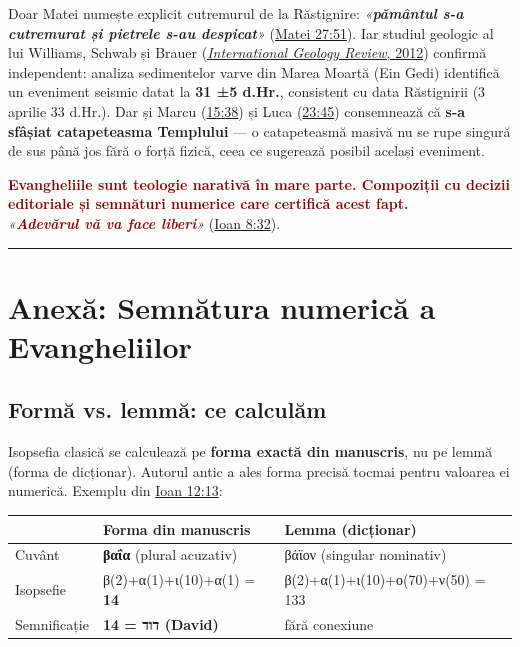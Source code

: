 \documentclass[12pt,a4paper,twoside,openany]{book}
\begin{document}
Doar Matei numește explicit cutremurul de la Răstignire: \textit{«\textbf{pământul s-a cutremurat și pietrele s-au despicat}»} (\href{https://bibliaortodoxa.ro/carte.php?id=55\&cap=27\#51}{Matei 27:51}). Iar studiul geologic al lui Williams, Schwab și Brauer (\href{https://doi.org/10.1080/00206814.2011.639996}{\textit{International Geology Review}, 2012}) confirmă independent: analiza sedimentelor varve din Marea Moartă (Ein Gedi) identifică un eveniment seismic datat la \textbf{31 ±5 d.Hr.}, consistent cu data Răstignirii (3 aprilie 33 d.Hr.). Dar și Marcu (\href{https://bibliaortodoxa.ro/carte.php?id=53\&cap=15\#38}{15:38}) și Luca (\href{https://bibliaortodoxa.ro/carte.php?id=48\&cap=23\#45}{23:45}) consemnează că \textbf{s-a sfâșiat catapeteasma Templului} — o catapeteasmă masivă nu se rupe singură de sus până jos fără o forță fizică, ceea ce sugerează posibil același eveniment.

\textcolor{darkred}{\textbf{Evangheliile sunt teologie narativă în mare parte. Compoziții cu decizii editoriale și semnături numerice care certifică acest fapt.}} \\
\textit{«\textcolor{darkred}{\textbf{Adevărul vă va face liberi}}»} (\href{https://bibliaortodoxa.ro/carte.php?id=35\&cap=8\#32}{Ioan 8:32}).


\bigskip\noindent\textcolor{darkred}{\rule{\textwidth}{2pt}}\bigskip

\chapter{Anexă: Semnătura numerică a Evangheliilor}\label{semnatura}

\section*{Formă vs. lemmă: ce calculăm}

Isopsefia clasică se calculează pe \textbf{forma exactă din manuscris}, nu pe lemmă (forma de dicționar). Autorul antic a ales forma precisă tocmai pentru valoarea ei numerică. Exemplu din \href{https://bibliaortodoxa.ro/carte.php?id=35\&cap=12\#13}{Ioan 12:13}:

\begin{center}
\small
\begin{tabular}{L{3cm}L{4.5cm}L{4.5cm}}
\toprule
{}
& \textbf{Forma din manuscris} & \textbf{Lemma (dicționar)} \\
\midrule
Cuvânt & \textbf{βαΐα} (plural acuzativ) & βάϊον (singular nominativ) \\
Isopsefie & β(2)+α(1)+ι(10)+α(1) = \textbf{14} & β(2)+α(1)+ι(10)+ο(70)+ν(50) = 133 \\
Semnificație & \textbf{14 = דוד (David)} & fără conexiune \\
\bottomrule
\end{tabular}
\end{center}
\end{document}
